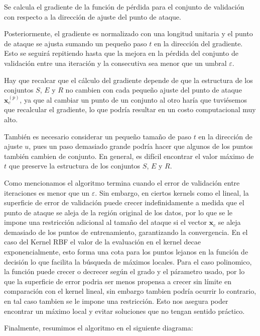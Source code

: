 \documentclass[letterpaper,12pt,oneside]{book}
\begin{document}
{{{{Se calcula el gradiente de la función de pérdida para el conjunto de validación con respecto a la dirección de ajuste del punto de ataque.

Posteriormente, el gradiente es normalizado con una longitud unitaria y el punto de ataque se ajusta sumando un pequeño paso \(t\) en la dirección del gradiente. Esto se seguirá repitiendo hasta que la mejora en la pérdida del conjunto de validación entre una iteración y la consecutiva sea menor que un umbral \(\varepsilon\).

Hay que recalcar que el cálculo del gradiente depende de que la estructura de los conjuntos \(S\), \(E\) y \(R\) no cambien con cada pequeño ajuste del punto de ataque \( \mathbf{x}_c^{(p)}\), ya que al cambiar un punto de un conjunto al otro haría que tuviésemos que recalcular el gradiente, lo que podría resultar en un costo computacional muy alto.

También es necesario considerar un pequeño tamaño de paso \(t\) en la dirección de ajuste \(u\), pues un paso demasiado grande podría hacer que algunos de los puntos también cambien de conjunto. En general, es difícil encontrar el valor máximo de \(t\) que preserve la estructura de los conjuntos \(S\), \(E\) y \(R\).

Como mencionamos el algoritmo termina cuando el error de validación entre iteraciones es menor que un \(\varepsilon\). Sin embargo, en ciertos kernels como el lineal, la superficie de error de validación puede crecer indefinidamente a medida que el punto de ataque se aleja de la región original de los datos, por lo que se le impone una restricción adicional al tamaño del ataque si el vector \( \mathbf{x}_c\) se aleja demasiado de los puntos de entrenamiento, garantizando la convergencia.
En el caso del Kernel RBF el valor de la evaluación en el kernel decae exponencialmente, esto forma una cota para los puntos lejanos en la función de decisión lo que facilita la búsqueda de máximos locales.
Para el caso polinomico, la función puede crecer o decrecer según el grado y el párametro usado, por lo que la superficie de error podria ser menos propensa a crecer sin límite en comparación con el kernel lineal, sin embargo tambien podría ocurrir lo contrario, en tal caso tambien se le impone una restricción.
Esto nos asegura poder encontrar un máximo local y evitar soluciones que no tengan sentido práctico.

Finalmente, resumimos el algoritmo en el siguiente diagrama:


\newpage

}}}}
\end{document}
